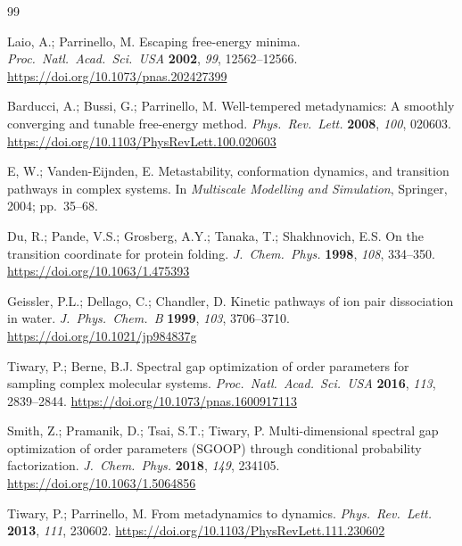 \documentclass[12pt, a4paper]{article}
\begin{document}
\newpage
\begin{thebibliography}{99}

Laio, A.; Parrinello, M.
\newblock Escaping free-energy minima.
\newblock \emph{Proc.\ Natl.\ Acad.\ Sci.\ USA} \textbf{2002}, \emph{99}, 12562--12566.
\newblock \url{https://doi.org/10.1073/pnas.202427399}

Barducci, A.; Bussi, G.; Parrinello, M.
\newblock Well-tempered metadynamics: A smoothly converging and tunable free-energy method.
\newblock \emph{Phys.\ Rev.\ Lett.} \textbf{2008}, \emph{100}, 020603.
\newblock \url{https://doi.org/10.1103/PhysRevLett.100.020603}

E, W.; Vanden-Eijnden, E.
\newblock Metastability, conformation dynamics, and transition pathways in complex systems.
\newblock In \emph{Multiscale Modelling and Simulation}, Springer, 2004; pp.~35--68.

Du, R.; Pande, V.S.; Grosberg, A.Y.; Tanaka, T.; Shakhnovich, E.S.
\newblock On the transition coordinate for protein folding.
\newblock \emph{J.\ Chem.\ Phys.} \textbf{1998}, \emph{108}, 334--350.
\newblock \url{https://doi.org/10.1063/1.475393}

Geissler, P.L.; Dellago, C.; Chandler, D.
\newblock Kinetic pathways of ion pair dissociation in water.
\newblock \emph{J.\ Phys.\ Chem.\ B} \textbf{1999}, \emph{103}, 3706--3710.
\newblock \url{https://doi.org/10.1021/jp984837g}

Tiwary, P.; Berne, B.J.
\newblock Spectral gap optimization of order parameters for sampling complex molecular systems.
\newblock \emph{Proc.\ Natl.\ Acad.\ Sci.\ USA} \textbf{2016}, \emph{113}, 2839--2844.
\newblock \url{https://doi.org/10.1073/pnas.1600917113}

Smith, Z.; Pramanik, D.; Tsai, S.T.; Tiwary, P.
\newblock Multi-dimensional spectral gap optimization of order parameters (SGOOP) through conditional probability factorization.
\newblock \emph{J.\ Chem.\ Phys.} \textbf{2018}, \emph{149}, 234105.
\newblock \url{https://doi.org/10.1063/1.5064856}

Tiwary, P.; Parrinello, M.
\newblock From metadynamics to dynamics.
\newblock \emph{Phys.\ Rev.\ Lett.} \textbf{2013}, \emph{111}, 230602.
\newblock \url{https://doi.org/10.1103/PhysRevLett.111.230602}


\end{thebibliography}
\end{document}
